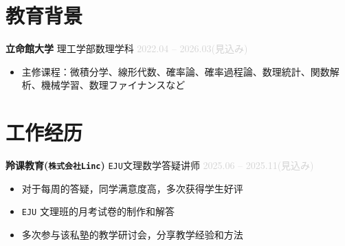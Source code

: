 \documentclass[11pt,a4paper]{article}
\newcommand{\resumeSubheading}[4]{
    \textbf{#1} \quad #2 \hfill \textcolor{lightgray}{#3}\\
    \textit{\small#4}
}
\begin{document}
\section*{教育背景}
\resumeSubheading{立命館大学}{理工学部数理学科}{2022.04 -- 2026.03(見込み)}{}
\begin{itemize}
    \item 主修课程：微積分学、線形代数、確率論、確率過程論、数理統計、関数解析、機械学習、数理ファイナンスなど
\end{itemize}

\section*{工作经历}
\resumeSubheading{羚课教育(\texttt{株式会社Linc})}{\texttt{EJU}文理数学答疑讲师}{2025.06 -- 2025.11(見込み)}{}
\begin{itemize}
    \item 对于每周的答疑，同学满意度高，多次获得学生好评
    \item \texttt{EJU} 文理班的月考试卷的制作和解答
    \item 多次参与该私塾的教学研讨会，分享教学经验和方法
\end{itemize}


\end{document}
